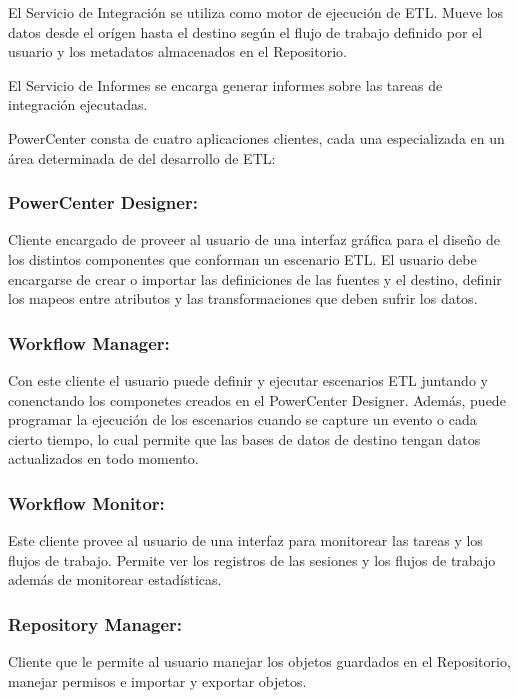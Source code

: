 El Servicio de Integraci\'on se utiliza como motor de ejecución de ETL. Mueve los datos desde el or\'igen hasta el 
destino seg\'un el flujo de trabajo definido por el usuario y los metadatos almacenados en el Repositorio.

El Servicio de Informes se encarga generar informes sobre las tareas de integración ejecutadas.


PowerCenter consta de cuatro aplicaciones clientes, cada una especializada en un \'area determinada de del 
desarrollo de ETL:

\subsubsection{PowerCenter Designer:}

Cliente encargado de proveer al usuario de una interfaz gr\'afica para el diseño de los distintos componentes 
que conforman un escenario ETL. El usuario debe encargarse de crear o importar las definiciones de las fuentes y el 
destino, definir los mapeos entre atributos y las transformaciones que deben sufrir los datos.

\subsubsection{Workflow Manager:}

Con este cliente el usuario puede definir y ejecutar escenarios ETL juntando y conenctando los componetes creados en el 
PowerCenter Designer. Adem\'as, puede programar la ejecución de los escenarios cuando se capture un evento o cada 
cierto tiempo, lo cual permite que las bases de datos de destino tengan datos actualizados en todo momento.

\subsubsection{Workflow Monitor:} 

Este cliente provee al usuario de una interfaz para monitorear las tareas y los flujos de trabajo. Permite ver 
los registros de las sesiones y los flujos de trabajo además de monitorear estad\'isticas.

\subsubsection{Repository Manager:}

Cliente que le permite al usuario manejar los objetos guardados en el Repositorio, manejar permisos e 
importar y exportar objetos.




